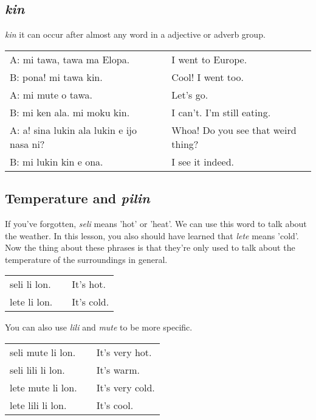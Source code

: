 {\subsection*{\textit{kin}}
%
\textit{kin} it can occur after almost any word in a adjective or adverb group. 

\begin{supertabular}{p{5,5cm}|ll}
A: mi tawa, tawa ma Elopa. && I went to Europe. \\
B: pona! mi tawa kin. && Cool! I went too. \\
A: mi mute o tawa. && Let's go. \\
B: mi ken ala. mi moku kin. && I can't. I'm still eating. \\
A: a! sina lukin ala lukin e ijo nasa ni? && Whoa! Do you see that weird thing? \\
B: mi lukin kin e ona. && I see it indeed. \\
\end{supertabular} 
%
{}
\subsection*{Temperature and \textit{pilin}}
%
If you've forgotten, \textit{seli} means 'hot' or 'heat'. 
We can use this word to talk about the weather. 
In this lesson, you also should have learned that \textit{lete} means 'cold'. 
Now the thing about these phrases is that they're only used to talk about the temperature of the surroundings in general. 

\begin{supertabular}{p{5,5cm}|ll}
seli li lon. && It's hot. \\
lete li lon. && It's cold. \\
\end{supertabular} 

You can also use \textit{lili} and \textit{mute} to be more specific. 
 
\begin{supertabular}{p{5,5cm}|ll}
seli mute li lon. && It's very hot. \\
seli lili li lon. && It's warm. \\
lete mute li lon. && It's very cold. \\
lete lili li lon. && It's cool. \\
\end{supertabular} 

}
